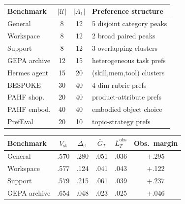 \documentclass{article} %
\begin{document}
\begin{table}[t]
\centering
\small
\begin{minipage}[t]{0.48\textwidth}
\vspace{0pt}
\centering
\captionsetup{justification=raggedright,singlelinecheck=false}
\begingroup
\scriptsize
\setlength{\tabcolsep}{2.5pt}
\begin{tabular}{lccl}
\toprule
\textbf{Benchmark} & $|\mathcal{U}|$ & $|A_1|$ & Preference structure \\
\midrule
General       &  8 & 12 & 5 disjoint category peaks \\
Workspace     &  8 & 12 & 2 broad paired peaks \\
Support       &  8 & 12 & 3 overlapping clusters \\
GEPA archive  & 12 & 15 & heterogeneous task prefs \\
Hermes agent  & 15 & 20 & (skill,mem,tool) clusters \\
BESPOKE       & 30 & 40 & 4-dim rubric prefs \\
PAHF shop.    & 20 & 40 & product-attribute prefs \\
PAHF embod.   & 40 & 40 & embodied object choice \\
PrefEval      & 20 & 10 & topic-strategy prefs \\
\bottomrule
\end{tabular}
\endgroup
{}
\label{tab:envs}
\end{minipage}
\hfill
\begin{minipage}[t]{0.50\textwidth}
\vspace{0pt}
\centering
\captionsetup{justification=raggedright,singlelinecheck=false}
\begingroup
\scriptsize
\setlength{\tabcolsep}{2.5pt}
\begin{tabular}{lccccc}
\toprule
\textbf{Benchmark} & $V_{\mathrm{st}}$ & $\Delta_{\mathrm{rt}}$ & $\bar G_T$ & $\bar L_T^{\mathrm{obs}}$ & \textbf{Obs.\ margin} \\
\midrule
General       & .570 & .280 & .051 & .036 & $\mathbf{+.295}$ \\
Workspace     & .577 & .124 & .041 & .043 & +.122 \\
Support       & .579 & .215 & .061 & .039 & +.237 \\
GEPA archive  & .654 & .048 & .023 & .025 & +.046 \\

\end{tabular}
\end{minipage}
\end{table}
\end{document}
